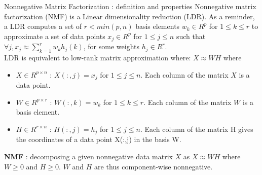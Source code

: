 \documentclass[final]{beamer}
\newlength{\threecolwid}
\begin{document}
\begin{frame}
\begin{columns}[t]
\begin{column}{\threecolwid}

\begin{exampleblock}{Nonnegative Matrix Factorization : definition and properties}
Nonnegative matrix factorization (NMF) is a Linear dimensionality reduction (LDR). As a reminder, a LDR computes a set of $r < min(p,n)$ basis elements $w_k \in R^p$ for $1 \leq k \leq r$ to approximate a set of data points $x_j \in R^{p}$ for $1 \leq j \leq n$ such that $\forall j, x_j \approx \sum_{k = 1}^{r} w_{k} h_{j}(k)$, for some weights $h_j\in R^r$. \\
LDR is equivalent to low-rank matrix approximation where: $X \approx W H$ where \\
     \begin{itemize}
     \item $X \in R^{p \times n}$ : $X(:,j) = x_j$ for $1 \leq j \leq n$. Each column of the matrix $X$ is a data point.
     \item $W \in R^{p \times r}$ : $W(:,k) = w_k$ for $1 \leq k \leq r$. Each column of the matrix $W$ is a basis element.
     \item $H \in R^{r \times n}$ : $H(:,j) = h_j$ for $1 \leq j \leq n$. Each column of the matrix H gives the coordinates of a data point X(:,j) in the basis W.
     \end{itemize}

     \textbf{NMF} : decomposing a given nonnegative data matrix $X$ as $X \approx W H$ where $W \geq 0$ and $H \geq 0$. $W$ and $H$ are thus component-wise nonnegative.
     
\end{exampleblock}





\end{column}
\end{columns}
\end{frame}
\end{document}
